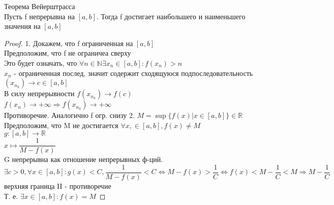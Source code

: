 \begin{theorem}
	Теорема Вейерштрасса\\
	Пусть f непрерывна на $[a, b] $. Тогда f достигает наибольшего и наименьшего значения на $ [a,b]$ \\
	\begin{proof}
		1. Докажем, что  f ограниченная на $[a, b] $ \\
		Предположим, что f не ограничеа сверху\\
		Это будет означать, что $ \forall n \in \mathbb{N} \exists x_n \in [a, b]  : f(x_n) > n $ \\
		$x_n$ - ограниченная послед, значит содержит сходящуюся подпоследовательность $ (x_{n_k})  \rightarrow c \in [a, b] $ \\
		В силу непрерывности $ f(x_{n_k}) \rightarrow f(c) $\\
		$ f(x_n) \rightarrow +\infty \Rightarrow f(x_{n_k}) \rightarrow +\infty $\\
		Противоречие. Аналогично f огр. снизу
		2. $ M = \sup \{ f(x) | x \in [a, b]  \} \in \mathbb{R} $ \\
		Предположим, что M не достигается $ \forall x, \in [a, b] , f(x) \neq M $ \\
		$ g : [a, b] \rightarrow \mathbb{R} $ \\
		$ x \mapsto \dfrac{ 1}{M - f(x)} $ \\
		G непрерывна как отношение непрерывных ф-ций.\\
		$ \exists c > 0, \forall x \in [a, b]  : g(x) < C, \dfrac{1}{M - f(x)} < C \Leftrightarrow M - f(x) > \dfrac{ 1}{C} \Leftrightarrow f(x) < M - \dfrac{ 1}{C}  < M \Rightarrow M - \dfrac{1}{C}$ верхняя граница H - противоречие \\
		Т. е. $ \exists x \in [a, b] : f(x) = M $ 
	\end{proof}
\end{theorem}
